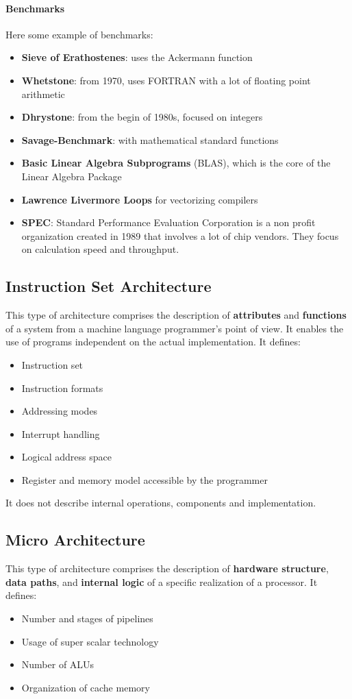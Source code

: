 \paragraph{Benchmarks}
Here some example of benchmarks:
\begin{itemize}
	\item \textbf{Sieve of Erathostenes}: uses the Ackermann function
	\item \textbf{Whetstone}: from 1970, uses FORTRAN with a lot of floating point arithmetic
	\item \textbf{Dhrystone}: from the begin of 1980s, focused on integers
	\item \textbf{Savage-Benchmark}: with mathematical standard functions
	\item \textbf{Basic Linear Algebra Subprograms} (BLAS), which is the core of the Linear Algebra Package
	\item \textbf{Lawrence Livermore Loops} for vectorizing compilers
	\item \textbf{SPEC}: Standard Performance Evaluation Corporation is a non profit organization created in 1989 that involves a lot of chip vendors. They focus on calculation speed and throughput.
\end{itemize}

\subsection{Instruction Set Architecture}
This type of architecture comprises the description of \textbf{attributes} and \textbf{functions} of a system from a machine language programmer's point of view. It enables the use of programs independent on the actual implementation. It defines:
\begin{itemize}
	\item Instruction set
	\item Instruction formats
	\item Addressing modes
	\item Interrupt handling
	\item Logical address space
	\item Register and memory model accessible by the programmer
\end{itemize}
\begin{note}
	It does not describe internal operations, components and implementation.
\end{note}

\subsection{Micro Architecture}
This type of architecture comprises the description of \textbf{hardware structure}, \textbf{data paths}, and \textbf{internal logic} of a specific realization of a processor. It defines:
\begin{itemize}
	\item Number and stages of pipelines
	\item Usage of super scalar technology
	\item Number of ALUs
	\item Organization of cache memory
\end{itemize}

